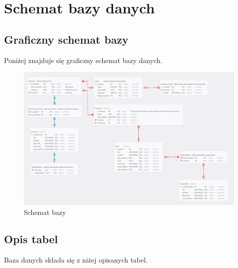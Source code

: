 \documentclass{article}
\begin{document}
	\section{Schemat bazy danych}
	
	\subsection{Graficzny schemat bazy}
	
	Poniżej znajduje się graficzny schemat bazy danych.
	
	\begin{figure}[H]
		\centering
		\includegraphics[scale=0.2]{diagram.PNG}
		\caption{Schemat bazy}
	\end{figure}
	
	\subsection{Opis tabel}
	
	Baza danych składa się z niżej opisanych tabel. 
	
\end{document}
